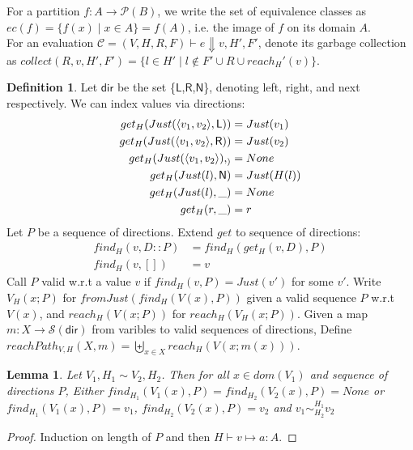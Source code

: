 \documentclass[11pt]{article}
\newcommand{\ms}[1]{\ensuremath{\mathsf{#1}}}
\newcommand{\veq}[4]{#3 \sim^{#1}_{#2} #4}
\newtheorem{lemma}[theorem]{Lemma}
\theoremstyle{definition}
\newtheorem{definition}{Definition}[section]
\begin{document}
For a partition $f : A \to \mathcal{P}(B)$, we write the set of equivalence classes
as $ec(f) = \{f(x) \mid x \in A\} = f(A)$, i.e. the image of $f$ on its domain $A$.\\

For an evaluation $\mathcal{C} = (V,H,R,F) \vdash e \Downarrow v,H',F'$, denote its
garbage collection
as $collect(R,v,H',F') = \{l \in H' \mid l \notin F' \cup R \cup reach_H'(v)\}$.

\begin{definition}
	Let \ms{dir} be the set \{\ms{L},\ms{R},\ms{N}\}, denoting left, right, and next 
	respectively. We can index values via directions:
	\begin{align*}
		get_H(Just(\pairexcst{v_1}{v_2},\ms{L})) &= Just(v_1)\\
		get_H(Just(\pairexcst{v_1}{v_2},\ms{R})) &= Just(v_2)\\
		get_H(Just(\pairexcst{v_1}{v_2}),_) &= None\\
		get_H(Just(l),\ms{N}) &= Just(H(l)) \\
		get_H(Just(l), \_) &= None\\
		get_H(r,\_) &= r
	\end{align*}
	Let $P$ be a sequence of directions. Extend $get$ to sequence of directions:
	\begin{align*}
		find_H(v,D::P) &= find_H(get_H(v,D),P)\\
		find_H(v,[]) &= v
	\end{align*}
	Call $P$ valid w.r.t a value $v$ if $find_H(v,P) = Just (v')$ for some $v'$.
	Write $V_H(x;P)$ for $fromJust(find_H(V(x),P))$ given a valid sequence $P$ w.r.t $V(x)$,
	and $reach_H(V(x;P))$ for $reach_H(V_H(x;P))$.
	Given a map $m : X \to \mathcal{S}(\ms{dir})$ from varibles to valid sequences of directions, 
	Define $reachPath_{V,H}(X,m) = \biguplus_{x \in X} reach_H(V(x;m(x)))$.
	
\end{definition}

\begin{lemma}
	Let $V_1,H_1 \sim V_2,H_2$. Then for all $x \in dom(V_1)$ and sequence of directions $P$, 
	Either $find_{H_1}(V_1(x),P) = find_{H_2}(V_2(x),P) = None$ or 
	$find_{H_1}(V_1(x),P) = v_1$, $find_{H_2}(V_2(x),P) = v_2$ and
	$\veq{H_1}{H_2}{v_1}{v_2}$
\end{lemma}

\begin{proof}
	Induction on length of $P$ and then $H \vdash v \mapsto a : A$.
\end{proof}
\end{document}
